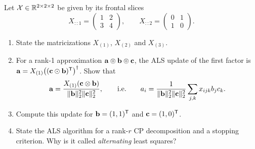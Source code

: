 Let $\mathcal{X}\in\mathbb{R}^{2\times2\times2}$ be given by its frontal slices
\[
X_{::1}=\begin{pmatrix}1&2\\3&4\end{pmatrix},\qquad X_{::2}=\begin{pmatrix}0&1\\1&0\end{pmatrix}.
\]
\begin{enumerate}
\item State the matricizations $X_{(1)}$, $X_{(2)}$ and $X_{(3)}$.
\item For a rank-1 approximation $\mathbf{a}\circledcirc\mathbf{b}\circledcirc\mathbf{c}$, the ALS update of the first factor is $\mathbf{a}=X_{(1)}\big((\mathbf{c}\odot\mathbf{b})^{\mathsf{T}}\big)^\dagger$. Show that
\[
\mathbf{a}=\frac{X_{(1)}(\mathbf{c}\otimes\mathbf{b})}{\lVert \mathbf{b}\rVert_2^2\lVert \mathbf{c}\rVert_2^2},\qquad\text{i.e.}\qquad a_i=\frac{1}{\lVert \mathbf{b}\rVert_2^2\lVert \mathbf{c}\rVert_2^2}\sum_{j,k}x_{ijk}b_jc_k.
\]
\item Compute this update for $\mathbf{b}=(1,1)^{\mathsf{T}}$ and $\mathbf{c}=(1,0)^{\mathsf{T}}$.
\item State the ALS algorithm for a rank-$r$ CP decomposition and a stopping criterion. Why is it called \emph{alternating} least squares?
\end{enumerate}

